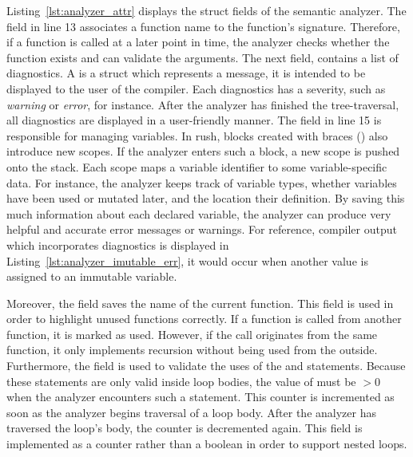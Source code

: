 Listing~\ref{lst:analyzer_attr} displays the struct fields of the semantic analyzer.
The field  in line 13 associates a function name to the function's signature.
Therefore, if a function is called at a later point in time, the analyzer checks whether the function exists and can validate the arguments.
The next field,  contains a list of diagnostics.
A  is a struct which represents a message, it is intended to be displayed to the user of the compiler.
Each diagnostics has a severity, such as \emph{warning} or \emph{error}, for instance.
After the analyzer has finished the tree-traversal, all diagnostics are displayed in a user-friendly manner.
The  field in line 15 is responsible for managing variables.
In rush, blocks created with braces (\qVerb{\{\}}) also introduce new scopes.
If the analyzer enters such a block, a new scope is pushed onto the  stack.
Each scope maps a variable identifier to some variable-specific data.
For instance, the analyzer keeps track of variable types, whether variables have been used or mutated later, and the location their definition.
By saving this much information about each declared variable, the analyzer can produce very helpful and accurate error messages or warnings.
For reference, compiler output which incorporates diagnostics is displayed in Listing~\ref{lst:analyzer_imutable_err},
it would occur when another value is assigned to an immutable variable.


Moreover, the field  saves the name of the current function.
This field is used in order to highlight unused functions correctly.
If a function is called from another function, it is marked as used.
However, if the call originates from the same function, it only implements recursion without being used from the outside.
Furthermore, the  field is used to validate the uses of the  and  statements.
Because these statements are only valid inside loop bodies, the value of  must be $> 0$ when the analyzer encounters such a statement.
This counter is incremented as soon as the analyzer begins traversal of a loop body.
After the analyzer has traversed the loop's body, the counter is decremented again.
This field is implemented as a counter rather than a boolean in order to support nested loops.

